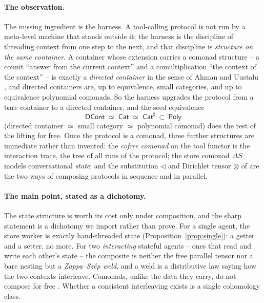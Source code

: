 \documentclass[11pt]{amsart}
\newcommand{\comp}{\mathbin{\triangleleft}}       %
\newcommand{\DCont}{\mathsf{DCont}}
\newcommand{\Cat}{\mathsf{Cat}}
\newcommand{\Poly}{\mathsf{Poly}}
\theoremstyle{plain}
\theoremstyle{definition}
\theoremstyle{remark}
\begin{document}
\paragraph{The observation.}
The missing ingredient is the harness. A tool-calling protocol is not run by a meta-level machine
that stands outside it; the harness is the discipline of threading context from one step to the
next, and that discipline is \emph{structure on the same container}. A container whose extension
carries a comonad structure -- a counit ``answer from the current context'' and a comultiplication
``the context of the context'' -- is exactly a \emph{directed container} in the sense of Ahman and
Uustalu \cite{dircont}, and directed containers are, up to equivalence, small categories, and up to
equivalence polynomial comonads. So the harness upgrades the protocol from a bare container to a
directed container, and the seed equivalence
\begin{equation}\label{eq:chain}
  \DCont\;\simeq\;\Cat\;\simeq\;\Cat^{\sharp}\ \subset\ \Poly
\end{equation}
(directed container $\simeq$ small category $\simeq$ polynomial comonad) does the rest of the lifting
for free. Once the protocol is a comonad, three further structures are immediate rather than
invented: the \emph{cofree comonad} on the tool functor is the interaction trace, the tree of all
runs of the protocol; the store comonad $\Delta S$ models conversational \emph{state}; and the
substitution $\comp$ and Dirichlet tensor $\otimes$ of \cite{spivakref,niuspivak} are the two ways of
composing protocols in sequence and in parallel.

\paragraph{The main point, stated as a dichotomy.}
The state structure is worth its cost only under composition, and the sharp statement is a dichotomy
we import rather than prove. For a single agent, the store worker is exactly hand-threaded state
(Proposition~\ref{prop:single}): a getter and a setter, no more. For two \emph{interacting} stateful
agents -- ones that read and write each other's state -- the composite is neither the free parallel
tensor nor a bare nesting but a \emph{Zappa--Sz\'ep weld}, and a weld is a distributive law saying
how the two contexts interleave. Comonads, unlike the data they carry, do not compose for free
\cite{ahmanuustaluDL}. Whether a consistent interleaving exists is a single cohomology class.
\end{document}
